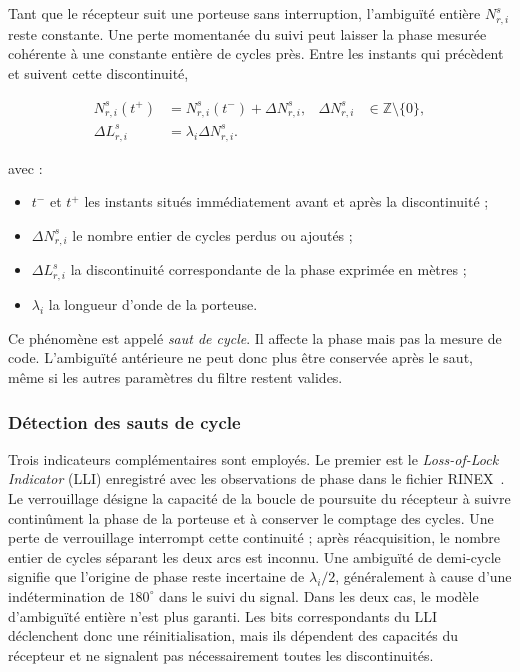 Tant que le récepteur suit une porteuse sans interruption, l'ambiguïté entière
$N_{r,i}^s$ reste constante. Une perte momentanée du suivi peut laisser la
phase mesurée cohérente à une constante entière de cycles près. Entre les
instants qui précèdent et suivent cette discontinuité,

\begin{align}
N_{r,i}^s(t^+)
&=
N_{r,i}^s(t^-)+\Delta N_{r,i}^s,
&
\Delta N_{r,i}^s
&\in\mathbb Z\setminus\{0\},
\\
\Delta L_{r,i}^s
&=
\lambda_i\Delta N_{r,i}^s.
\label{eq:cycle_slip_definition}
\end{align}

avec :

\begin{itemize}
    \item $t^-$ et $t^+$ les instants situés immédiatement avant et après la
    discontinuité ;
    \item $\Delta N_{r,i}^s$ le nombre entier de cycles perdus ou ajoutés ;
    \item $\Delta L_{r,i}^s$ la discontinuité correspondante de la phase
    exprimée en mètres ;
    \item $\lambda_i$ la longueur d'onde de la porteuse.
\end{itemize}

Ce phénomène est appelé \emph{saut de cycle}. Il affecte la phase mais pas la
mesure de code. L'ambiguïté antérieure ne peut donc plus être conservée après
le saut, même si les autres paramètres du filtre restent valides.

\subsubsection{Détection des sauts de cycle}

Trois indicateurs complémentaires sont employés. Le premier est le
\textit{Loss-of-Lock Indicator} (LLI) enregistré avec les observations de
phase dans le fichier RINEX~\cite{rinex304}. Le verrouillage désigne la capacité de la boucle
de poursuite du récepteur à suivre continûment la phase de la porteuse et à
conserver le comptage des cycles. Une perte de verrouillage interrompt cette
continuité ; après réacquisition, le nombre entier de cycles séparant les deux
arcs est inconnu. Une ambiguïté de demi-cycle signifie que l'origine de phase
reste incertaine de $\lambda_i/2$, généralement à cause d'une indétermination
de $180^\circ$ dans le suivi du signal. Dans les deux cas, le modèle
d'ambiguïté entière n'est plus garanti. Les bits correspondants du LLI
déclenchent donc une réinitialisation, mais ils dépendent des capacités du
récepteur et ne signalent pas nécessairement toutes les discontinuités.

